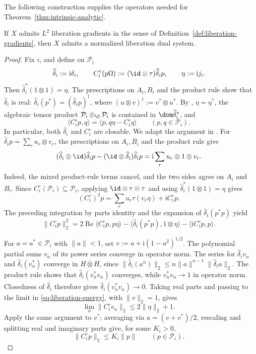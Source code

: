 The following construction supplies the operators needed for Theorem~\ref{thm:intrinsic-analytic}.
\begin{lemma}\label{lem:gradient-liberation}
If $X$ admits $L^2$ liberation gradients in the sense of Definition~\ref{def:liberation-gradients}, then $X$ admits a normalized liberation dual system.
\end{lemma}
\begin{proof}
Fix $i$, and define on $\mathcal P_i$
\[
 \widehat\delta_i:=\mathrm i\delta_i,\qquad
 C_i^\circ(p\Omega):=(\id\otimes\tau)\widehat\delta_ip,\qquad
 \eta:=\mathrm i j_i.
\]
Then $\widehat\delta_i^*(1\otimes1)=\eta$.
The prescriptions on $A_i,B_i$ and the product rule show that $\widehat\delta_i$ is real:
$\widehat\delta_i(p^*)=(\widehat\delta_ip)^\dagger$, where $(u\otimes v)^\dagger:=v^*\otimes u^*$.
By \cite[Lemmas~4.6--4.7]{Mai15}, $\eta=\eta^*$, the algebraic tensor product $\mathcal P_i\otimes_{\C}\mathcal P_i$ is contained in $\dom\widehat\delta_i^*$, and
\[
 \langle C_i^\circ p,q\rangle=\langle p,q\eta-C_i^\circ q\rangle
 \qquad(p,q\in\mathcal P_i).
\]
In particular, both $\widehat\delta_i$ and $C_i^\circ$ are closable.
We adapt the argument in \cite[proof of Lemma~12]{Dab10}.
For $\widehat\delta_i p=\sum_r u_r\otimes v_r$, the prescriptions on $A_i,B_i$ and the product rule give
\[
 (\widehat\delta_i\otimes\id)\widehat\delta_i p-(\id\otimes\widehat\delta_i)\widehat\delta_i p
 =\mathrm i\sum_r u_r\otimes1\otimes v_r.
\]
Indeed, the mixed product-rule terms cancel, and the two sides agree on $A_i$ and $B_i$.
Since $C_i^\circ(\mathcal P_i)\subseteq\mathcal P_i$, applying $\id\otimes\tau\otimes\tau$ and using $\widehat\delta_i^*(1\otimes1)=\eta$ gives
\[
 (C_i^\circ)^2p=\sum_r u_r\tau(v_r\eta)+\mathrm iC_i^\circ p.
\]
The preceding integration by parts identity and the expansion of $\widehat\delta_i(p^*p)$ yield
\begin{equation}\label{eq:liberation-energy}
 \|C_i^\circ p\|_2^2
 =2\operatorname{Re}\langle C_i^\circ p,p\eta\rangle
  -\langle\widehat\delta_i(p^*p),1\otimes\eta\rangle
  -\langle\mathrm iC_i^\circ p,p\rangle.
\end{equation}

For $a=a^*\in\mathcal P_i$ with $\|a\|<1$, set $v:=a+\mathrm i(1-a^2)^{1/2}$.
The polynomial partial sums $v_n$ of its power series converge in operator norm.
The series for $\widehat\delta_i v_n$ and $\widehat\delta_i(v_n^*)$ converge in $H\bar\otimes H$, since $\|\widehat\delta_i(a^n)\|_2\leq n\|a\|^{n-1}\|\widehat\delta_i a\|_2$.
The product rule shows that $\widehat\delta_i(v_n^*v_n)$ converges, while $v_n^*v_n\to1$ in operator norm.
Closedness of $\overline{\widehat\delta_i}$ therefore gives $\widehat\delta_i(v_n^*v_n)\to0$.
Taking real parts and passing to the limit in \eqref{eq:liberation-energy}, with $\|v\|_2=1$, gives
\[
 \lim_n\|C_i^\circ v_n\|_2\leq2\|\eta\|_2+1.
\]
Apply the same argument to $v^*$; averaging via $a=(v+v^*)/2$, rescaling and splitting real and imaginary parts give, for some $K_i>0$,
\[
 \|C_i^\circ p\|_2\leq K_i\|p\|\qquad(p\in\mathcal P_i).
\]


\end{proof}

